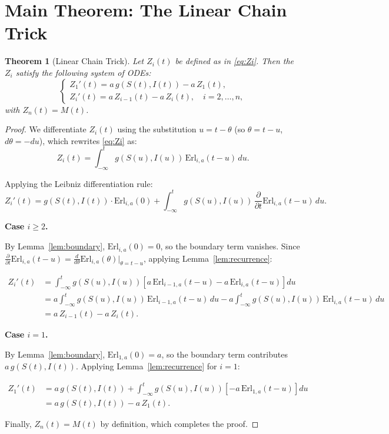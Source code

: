 \documentclass[12pt,a4paper]{article}
\newtheorem{theorem}{Theorem}
\theoremstyle{definition}
\begin{document}
\section{Main Theorem: The Linear Chain Trick}

\begin{theorem}[Linear Chain Trick]
\label{thm:LCT}
Let $Z_i(t)$ be defined as in \eqref{eq:Zi}. Then the $Z_i$ satisfy the following
system of ODEs:
\begin{equation}
    \begin{cases}
        Z_1'(t) = a\, g(S(t), I(t)) - a\, Z_1(t), \\[6pt]
        Z_i'(t) = a\, Z_{i-1}(t) - a\, Z_i(t), \quad i = 2, \ldots, n,
    \end{cases}
    \label{eq:chain}
\end{equation}
with $Z_n(t) = M(t)$.
\end{theorem}

\begin{proof}
We differentiate $Z_i(t)$ using the substitution $u = t - \theta$ (so $\theta = t - u$,
$d\theta = -du$), which rewrites \eqref{eq:Zi} as:
\[
    Z_i(t) = \int_{-\infty}^{t} g(S(u), I(u))\, \mathrm{Erl}_{i,a}(t - u)\, du.
\]

Applying the Leibniz differentiation rule:
\begin{equation}
    Z_i'(t) = g(S(t), I(t))\cdot \mathrm{Erl}_{i,a}(0)
    + \int_{-\infty}^{t} g(S(u), I(u))\, \frac{\partial}{\partial t}\mathrm{Erl}_{i,a}(t-u)\, du.
    \label{eq:leibniz}
\end{equation}

\medskip
\noindent\textbf{Case $i \geq 2$.}

By Lemma~\ref{lem:boundary}, $\mathrm{Erl}_{i,a}(0) = 0$, so the boundary term vanishes.
Since $\frac{\partial}{\partial t}\mathrm{Erl}_{i,a}(t-u) = \frac{d}{d\theta}\mathrm{Erl}_{i,a}(\theta)\big|_{\theta=t-u}$,
applying Lemma~\ref{lem:recurrence}:

\begin{align*}
    Z_i'(t) &= \int_{-\infty}^{t} g(S(u), I(u))
    \left[a\,\mathrm{Erl}_{i-1,a}(t-u) - a\,\mathrm{Erl}_{i,a}(t-u)\right] du \\
    &= a\int_{-\infty}^{t} g(S(u), I(u))\,\mathrm{Erl}_{i-1,a}(t-u)\,du
    - a\int_{-\infty}^{t} g(S(u), I(u))\,\mathrm{Erl}_{i,a}(t-u)\,du \\
    &= a\, Z_{i-1}(t) - a\, Z_i(t).
\end{align*}

\medskip
\noindent\textbf{Case $i = 1$.}

By Lemma~\ref{lem:boundary}, $\mathrm{Erl}_{1,a}(0) = a$, so the boundary term contributes
$a\, g(S(t), I(t))$. Applying Lemma~\ref{lem:recurrence} for $i=1$:

\begin{align*}
    Z_1'(t) &= a\, g(S(t), I(t))
    + \int_{-\infty}^{t} g(S(u), I(u))\left[-a\,\mathrm{Erl}_{1,a}(t-u)\right] du \\
    &= a\, g(S(t), I(t)) - a\, Z_1(t).
\end{align*}

\medskip
Finally, $Z_n(t) = M(t)$ by definition, which completes the proof.
\end{proof}
\end{document}

